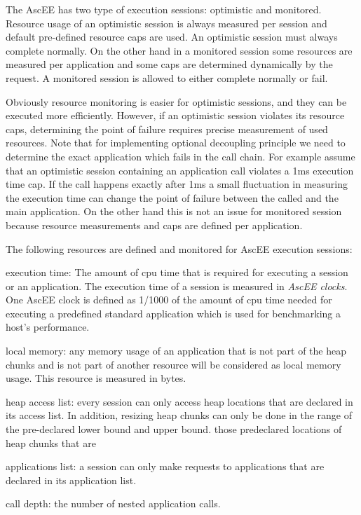 The AscEE has two type of execution sessions: optimistic and monitored. Resource usage of an optimistic session
is always measured per session and default pre-defined resource caps are used. An optimistic session must always
complete normally. On the other hand in a monitored session some resources are measured per application and some
caps are determined dynamically by the request. A monitored session is allowed to either complete normally or fail.

Obviously resource monitoring is easier for optimistic sessions, and they can be executed more efficiently. However, if
an optimistic session violates its resource caps, determining the point of failure requires precise measurement of
used resources. Note that for implementing optional decoupling principle we need to determine the exact application
which fails in the call chain. For example assume that an optimistic session containing an application call violates a
1ms execution time cap. If the call happens exactly after 1ms a small fluctuation in measuring the execution time can
change the point of failure between the called and the main application. On the other hand this is not an issue for
monitored session because resource measurements and caps are defined per application.

The following resources are defined and monitored for AscEE execution sessions:

execution time:
The amount of cpu time that is required for executing a session or an application. The execution time of a session
is measured in \emph{AscEE clocks}. One AscEE clock is defined as 1/1000 of the amount
of cpu time needed for executing a predefined standard application which is used for benchmarking a host's performance.

local memory: any memory usage of an application that is not part of the heap chunks and is not part of another resource
will be considered as local memory usage. This resource is measured in bytes.

heap access list: every session can only access heap locations that are declared in its access list. In addition,
resizing
heap chunks can only be done in the range of the pre-declared lower bound and upper bound. those predeclared
locations of heap chunks that are

applications list: a session can only make requests to applications that are declared in its application list.

call depth: the number of nested application calls.

